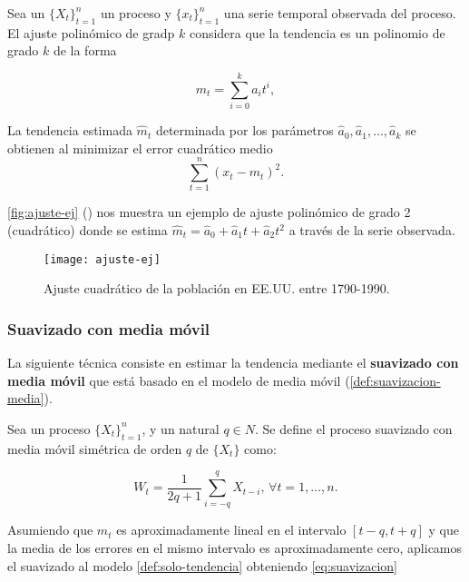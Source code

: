 \begin{definicion}
  Sea un $\{X_t\}_{t = 1}^n$ un proceso y $\{x_t\}_{t = 1}^n$ una serie temporal observada del proceso. El ajuste polinómico de gradp $k$ considera que la tendencia es un polinomio de grado $k$ de la forma

  $$m_t = \sum \limits^k_{i = 0} a_i t^i,$$

  La tendencia estimada $\hat{m}_t$ determinada por los parámetros $\hat{a}_0, \hat{a}_1, \ldots, \hat{a}_k$ se obtienen al minimizar el error cuadrático medio $$\sum \limits^n_{t = 1} (x_t - m_t)^2.$$
  \label{def:ajuste-polinomico}
\end{definicion}

\autoref{fig:ajuste-ej} (\cite{brockwell2002introduction}) nos muestra un ejemplo de ajuste polinómico de grado 2 (cuadrático) donde se estima $\hat{m}_t = \hat{a}_0 + \hat{a}_1 t + \hat{a}_2 t^2$ a través de la serie observada.

\begin{figure}[htpb]
  \centering
  \texttt{[image: ajuste-ej]}
  \caption{Ajuste cuadrático de la población en EE.UU. entre 1790-1990.}
  \label{fig:ajuste-ej}
\end{figure}

\subsubsection{Suavizado con media móvil}

La siguiente técnica consiste en estimar la tendencia mediante el \textbf{suavizado con media móvil} que está basado en el modelo de media móvil (\autoref{def:suavizacion-media}).

\begin{definicion}
  Sea un proceso $\{X_t\}_{t = 1}^n$, y un natural $q \in N$. Se define el proceso suavizado con media móvil simétrica de orden $q$ de $\{X_t\}$ como:

  $$ W_t = \dfrac{1}{2q + 1} \sum \limits^q_{i = -q} X_{t - i}, \, \forall t = 1, \ldots, n.$$
  \label{def:suavizacion-media}
\end{definicion}

Asumiendo que $m_t$ es aproximadamente lineal en el intervalo $[t - q, t + q]$ y que la media de los errores en el mismo intervalo es aproximadamente cero, aplicamos el suavizado al modelo \autoref{def:solo-tendencia} obteniendo \eqref{eq:suavizacion}

